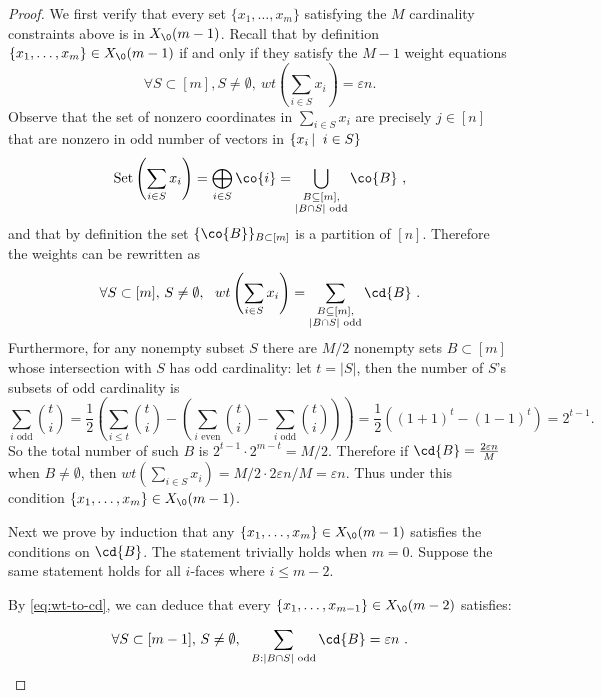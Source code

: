 \documentclass[10pt,a4paper]{article}
\theoremstyle{definition}
\theoremstyle{remark}
\newcommand{\Authornotecolored}[3]{{\sffamily\small\color{#1}{[#2: #3]}}}
\newcommand{\Authornotecolored}[3]{}
\newcommand{\Ynote}{\Authornotecolored{Purple}{Y}}
\newcommand{\abs}[1]{\lvert#1\rvert}
\newcommand\sett[2]{\left\{ #1 \left| \; \vphantom{#1 #2} \right. #2  \right\}}
\renewcommand{\le}{\leqslant}
\numberwithin{equation}{section}
\begin{document}
\begin{proof}
    We first verify that every set $\{x_1,\dots,x_m\}$ satisfying the $M$ cardinality constraints above is in $X_\0(m-1)$. Recall that by definition $\{x_1,\dots,x_m\}\in X_\0(m-1)$ if and only if they satisfy the $M-1$ weight equations \[\forall S\subset[m], S\neq \emptyset,~wt\left(\sum_{i\in S} x_i\right) = \varepsilon n.\] Observe that the set of nonzero coordinates in $\sum_{i\in S} x_i$ are precisely $j\in[n]$ that are nonzero in odd number of vectors in $\sett{x_i}{i\in S}$
    \[\text{Set}\left(\sum_{i\in S} x_i\right) = \bigoplus_{i\in S} \co{i} = \bigcup_{\substack{B\subseteq [m], \\\abs{B\cap S}\text{ odd}}}\co{B}~,\]
    and that by definition the set $\{\co{B}\}_{B\subset [m]}$ is a partition of $[n]$. Therefore \Ynote{"the union above is disjoint and "}the weights can be rewritten as
    \begin{equation}\label{eq:wt-to-cd}
        \forall S\subset [m],\,S\neq \emptyset,~~  wt\left(\sum_{i\in S} x_i\right) = \sum_{\substack{B\subseteq [m], \\\abs{B\cap S}\text{ odd}}} \cd{B} ~.
    \end{equation}
    Furthermore, for any nonempty subset $S$ there are $M/2$ nonempty sets $B\subset [m]$ whose intersection with $S$ has odd cardinality: let $t = |S|$, then the number of  $S$'s subsets of odd cardinality is  \[\sum_{i\text{ odd}} \binom{t}{i} = \frac{1}{2}\left(\sum_{i\le t} \binom{t}{i} - \left(\sum_{i\text{ even}} \binom{t}{i} - \sum_{i\text{ odd}} \binom{t}{i}\right) \right) =  \frac{1}{2} ((1+1)^t-(1-1)^t) = 2^{t-1}.\] 
    So the total number of such $B$ is $2^{t-1}\cdot 2^{m-t} = M/2$.
    Therefore if $\cd{B}  = \frac{2\varepsilon n}{M}$ when $B\neq \emptyset$, then $wt(\sum_{i\in S} x_i) = M/2\cdot 2\varepsilon n/M =
 \varepsilon n$. Thus under this condition $\{x_1,\dots,x_m\}\in X_\0(m-1)$.
    
    Next we prove by induction that any $\{x_1,\dots,x_m\} \in X_\0(m-1)$ satisfies the conditions on $\cd{B}$. The statement trivially holds when $m = 0$. Suppose the same statement holds for all $i$-faces where $i\le m-2$. 

    By \eqref{eq:wt-to-cd}, we can deduce that every $\{x_1,\dots,x_{m-1}\} \in X_\0(m-2)$ satisfies:

    \begin{equation}\label{eq:m-2-constraint}
        \forall S\subset[m-1],\,S\neq \emptyset,~~ \sum_{B: |B\cap S| \text{ odd}} \cd{B}  = \varepsilon n ~.
    \end{equation}


\end{proof}
\end{document}
